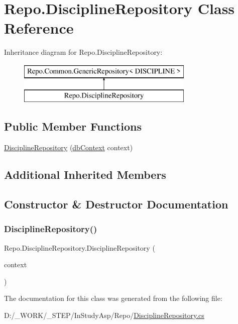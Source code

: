 \hypertarget{class_repo_1_1_discipline_repository}{}\section{Repo.\+Discipline\+Repository Class Reference}
\label{class_repo_1_1_discipline_repository}
Inheritance diagram for Repo.\+Discipline\+Repository\+:\begin{figure}[H]
\begin{center}
\leavevmode
\includegraphics[height=2.000000cm]{class_repo_1_1_discipline_repository}
\end{center}
\end{figure}
\subsection*{Public Member Functions}
\begin{DoxyCompactItemize}
\item 
\hyperlink{class_repo_1_1_discipline_repository_afa2affb6e48433534bbba785fb6b29b8}{Discipline\+Repository} (\hyperlink{class_e_f_oracle_1_1_model_1_1db_context}{db\+Context} context)
\end{DoxyCompactItemize}
\subsection*{Additional Inherited Members}


\subsection{Constructor \& Destructor Documentation}
\mbox{\label{class_repo_1_1_discipline_repository_afa2affb6e48433534bbba785fb6b29b8}} 
\subsubsection{\texorpdfstring{Discipline\+Repository()}{DisciplineRepository()}}
{\footnotesize\ttfamily Repo.\+Discipline\+Repository.\+Discipline\+Repository (\begin{DoxyParamCaption}\item[{\hyperlink{class_e_f_oracle_1_1_model_1_1db_context}{db\+Context}}]{context }\end{DoxyParamCaption})}



The documentation for this class was generated from the following file\+:\begin{DoxyCompactItemize}
\item 
D\+:/\+\_\+\+W\+O\+R\+K/\+\_\+\+S\+T\+E\+P/\+In\+Study\+Asp/\+Repo/\hyperlink{_discipline_repository_8cs}{Discipline\+Repository.\+cs}\end{DoxyCompactItemize}
